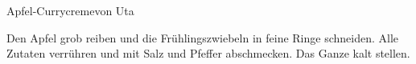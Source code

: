 \begin{recipe}{Apfel-Currycreme}{von Uta}
  \label{Apfel-Currycreme}
  \inglist

  \steps
  Den Apfel grob reiben und die Frühlingszwiebeln in feine Ringe schneiden.
  Alle Zutaten verrühren und mit Salz und Pfeffer abschmecken. Das Ganze kalt
  stellen.
\end{recipe}
